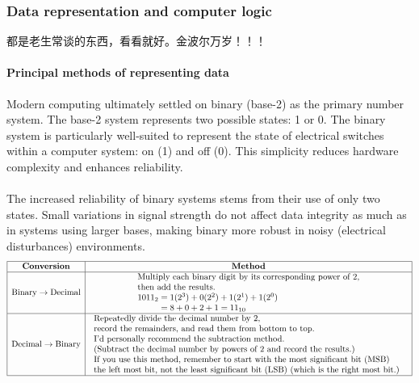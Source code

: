 \documentclass[a4paper,12pt]{article}
\begin{document}
\subsubsection{Data representation and computer logic}
都是老生常谈的东西，看看就好。金波尔万岁！！！
\paragraph{Principal methods of representing data}
Modern computing ultimately settled on binary (base-2) as the primary number system. The base-2 system represents two possible states: 1 or 0. The binary system is particularly well-suited to represent the state of electrical switches within a computer system: on (1) and off (0). This simplicity reduces hardware complexity and enhances reliability. \\\\
The increased reliability of binary systems stems from their use of only two states. Small 
variations in signal strength do not affect data integrity as much as in systems using larger bases, making binary more robust in noisy (electrical disturbances) environments. 
\[
\begin{array}{|c|c|}
\hline
\textbf{Conversion} & \textbf{Method} \\ \hline

\text{Binary} \rightarrow \text{Decimal}
&
\begin{array}{l}
\text{Multiply each binary digit by its corresponding power of }2,\\
\text{then add the results.}\\
1011_2 = 1(2^3)+0(2^2)+1(2^1)+1(2^0)\\
\phantom{1011_2}=8+0+2+1=11_{10}
\end{array}
\\ \hline

\text{Decimal} \rightarrow \text{Binary}
&
\begin{array}{l}
\text{Repeatedly divide the decimal number by }2,\\
\text{record the remainders, and read them from bottom to top.}\\
\text{I'd personally recommend the subtraction method.}\\
\text{(Subtract the decimal number by powers of 2 and record the results.)}\\
\text{If you use this method, remember to start with the most significant bit (MSB)}\\\text{the left most bit, not the least significant bit (LSB) (which is the right most bit.) }
\end{array}
\\ \hline

\end{array}
\]
\end{document}
